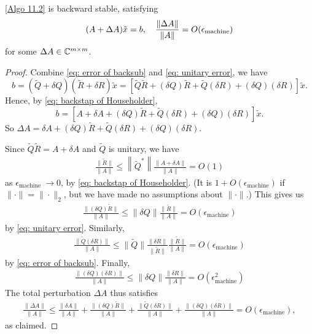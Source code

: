 \begin{theorem}
\label{thm: Backstap of linear system}
\autoref{Algo 11.2} is backward stable, satisfying
\begin{equation}
    \label{eq: backstap of algo 11.2}
    (A + \Delta  A) \tilde x = b, \quad \frac{\| \Delta  A\|}{\|A\|} = O(\epsilon_{\text{machine}})
\end{equation}
for some $ \Delta A \in \mathbb{C}^{m\times m} $.   
\end{theorem}
\begin{proof}
Combine \eqref{eq: error of backsub} and \eqref{eq: unitary error}, we have 
\[
    b=(\tilde{Q}+\delta Q)(\tilde{R}+\delta R) \tilde{x}=[\tilde{Q} \tilde{R}+(\delta Q) \tilde{R}+\tilde{Q}(\delta R)+(\delta Q)(\delta R)] \tilde{x}. 
\]
Hence, by \eqref{eq: backstap of Householder}, 
\[
    b=[A+\delta A+(\delta Q) \tilde{R}+\tilde{Q}(\delta R)+(\delta Q)(\delta R)] \tilde{x}. 
\]
So $\Delta A = \delta A+(\delta Q) \tilde{R}+\tilde{Q}(\delta R)+(\delta Q)(\delta R)$. 

Since $\tilde{Q} \tilde{R}=A+\delta A$ and $\tilde{Q}$ is unitary, we have
\begin{align*}
\frac{\|\tilde{R}\|}{\|A\|} \leq\left\|\tilde{Q}^*\right\| \frac{\|A+\delta A\|}{\|A\|}=O(1)
\end{align*}
as $\epsilon_{\text {machine }} \rightarrow 0$, by \eqref{eq: backstap of Householder}. (It is $1+O\left(\epsilon_{\text {machine}}\right)$ if $\|\cdot\|=\|\cdot\|_2$, but we have made no assumptions about $\|\cdot\|$.) This gives us
\begin{align*}
\frac{\|(\delta Q) \tilde{R}\|}{\|A\|} \leq\|\delta Q\| \frac{\|\tilde{R}\|}{\|A\|}=O\left(\epsilon_{\text {machine}}\right)
\end{align*}
by \eqref{eq: unitary error}. Similarly,
\begin{align*}
\frac{\|\tilde{Q}(\delta R)\|}{\|A\|} \leq\|\tilde{Q}\| \frac{\|\delta R\|}{\|\tilde{R}\|} \frac{\|\tilde{R}\|}{\|A\|}=O\left(\epsilon_{\text {machine}}\right)
\end{align*}
by \eqref{eq: error of backsub}. Finally,
\begin{align*}
\frac{\|(\delta Q)(\delta R)\|}{\|A\|} \leq\|\delta Q\| \frac{\|\delta R\|}{\|A\|}=O\left(\epsilon_{\text {machine}}^2\right)
\end{align*}
The total perturbation $\Delta A$ thus satisfies
\begin{align*}
\frac{\|\Delta A\|}{\|A\|} \leq \frac{\|\delta A\|}{\|A\|}+\frac{\|(\delta Q) \tilde{R}\|}{\|A\|}+\frac{\|\tilde{Q}(\delta R)\|}{\|A\|}+\frac{\|(\delta Q)(\delta R)\|}{\|A\|}=O\left(\epsilon_{\text {machine}}\right),
\end{align*}
as claimed.
\end{proof}

